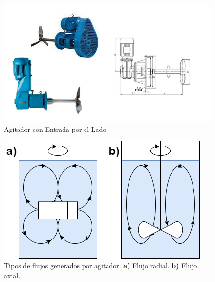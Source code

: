             \begin{figure}
                \centering
                \includegraphics[width=.5\textwidth]{img/fotos/batch_agitado_entrada_por_lado.jpg}
                \caption[Agitador con Entrada por el Lado]{Agitador con Entrada por el Lado \cite{cd_agitatorcom_cd_2012}}
                \label{fig:batch_agitado_entrada_por_lado}
            \end{figure}
            
            \begin{figure}
                \centering
                \includegraphics[width=.6\textwidth]{img/diagramas/Agitadores Flujos.png}
                \caption[Tipos de flujos generados por agitador]{Tipos de flujos generados por agitador. \textbf{a)} Flujo radial. \textbf{b)} Flujo axial.}
                \label{fig:agitadores_tipos_flujos}
            \end{figure}
            
